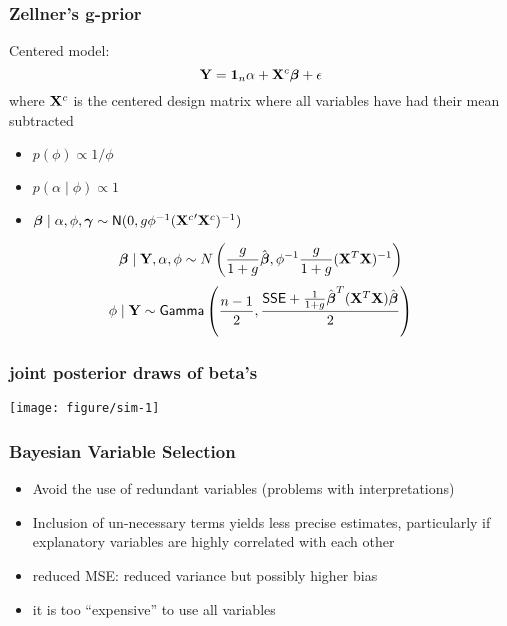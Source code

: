 \documentclass[handout]{beamer}\usepackage[]{graphicx}\usepackage[]{color}
\makeatletter
\def\maxwidth{ %
  \ifdim\Gin@nat@width>\linewidth
    \linewidth
  \else
    \Gin@nat@width
  \fi
}
\newenvironment{knitrout}{}{} %
\makeatother
\begin{document}
\begin{frame}\frametitle{Zellner's g-prior}
  Centered model:  $$\mathbf{Y} = \mathbf{1}_n \alpha + \mathbf{X}^c \boldsymbol{\beta} + \epsilon$$
  where $\mathbf{X}^c$ is the centered design matrix where all variables have
  had their mean subtracted \pause
\begin{itemize}
\item  $p(\phi) \propto 1/\phi$  \pause
\item   $p(\alpha \mid \phi) \propto 1$ \pause
\item  $\boldsymbol{\beta} \mid \alpha, \phi, \boldsymbol{\gamma} \sim \textsf{N}(0, g \phi^{-1}
  ({\mathbf{X}^c}^\prime \mathbf{X}^c)^{-1})$ \pause
\end{itemize}

$$\boldsymbol{\beta} \mid \mathbf{Y}, \alpha, \phi \sim N\left(\frac{g}{1 + g} \hat{\boldsymbol{\beta}}, \phi^{-1}\frac{g}{1 + g} (\mathbf{X}^T\mathbf{X})^{-1} \right)$$
$$ \phi \mid \mathbf{Y} \sim \textsf{Gamma} \left(\frac{n-1}{2}, \frac{\textsf{SSE} + \frac{1}{1 + g} \hat{\boldsymbol{\beta}}^T (\mathbf{X}^T\mathbf{X}) \hat{\boldsymbol{\beta}}}{2} \right) $$
\end{frame}

\begin{frame} \frametitle{joint posterior draws of beta's}
\begin{knitrout}
\color{fgcolor}

{\centering \texttt{[image: figure/sim-1]} 

}



\end{knitrout}

\end{frame}


\begin{frame} \frametitle{Bayesian Variable Selection}
  \begin{itemize}
   \item Avoid the use of redundant variables (problems with
    interpretations) \pause
   \item Inclusion of un-necessary terms yields less precise
  estimates, particularly if explanatory variables are highly
  correlated with each other \pause
  \item reduced MSE: reduced variance but possibly higher bias  \pause
  \item it is too ``expensive'' to use all variables
  \end{itemize}
\end{frame}
\end{document}
